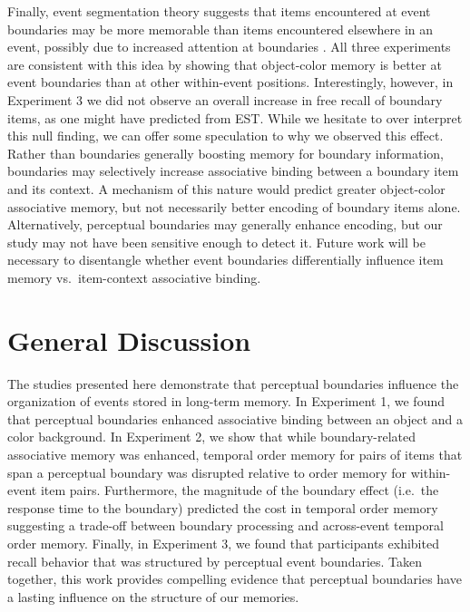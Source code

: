 Finally, event segmentation theory suggests that items encountered at
event boundaries may be more memorable than items encountered elsewhere
in an event, possibly due to increased attention at boundaries
\autocites{radvansky_across_2012}{zacks_event_2007}. All three
experiments are consistent with this idea by showing that object-color
memory is better at event boundaries than at other within-event
positions. Interestingly, however, in Experiment 3 we did not observe an
overall increase in free recall of boundary items, as one might have
predicted from EST. While we hesitate to over interpret this null
finding, we can offer some speculation to why we observed this effect.
Rather than boundaries generally boosting memory for boundary
information, boundaries may selectively increase associative binding
between a boundary item and its context. A mechanism of this nature
would predict greater object-color associative memory, but not
necessarily better encoding of boundary items alone. Alternatively,
perceptual boundaries may generally enhance encoding, but our study may
not have been sensitive enough to detect it. Future work will be
necessary to disentangle whether event boundaries differentially
influence item memory vs.~item-context associative binding.

\section{General Discussion}\label{general-discussion}

The studies presented here demonstrate that perceptual boundaries
influence the organization of events stored in long-term memory. In
Experiment 1, we found that perceptual boundaries enhanced associative
binding between an object and a color background. In Experiment 2, we
show that while boundary-related associative memory was enhanced,
temporal order memory for pairs of items that span a perceptual boundary
was disrupted relative to order memory for within-event item pairs.
Furthermore, the magnitude of the boundary effect (i.e.~the response
time to the boundary) predicted the cost in temporal order memory
suggesting a trade-off between boundary processing and across-event
temporal order memory. Finally, in Experiment 3, we found that
participants exhibited recall behavior that was structured by perceptual
event boundaries. Taken together, this work provides compelling evidence
that perceptual boundaries have a lasting influence on the structure of
our memories.

